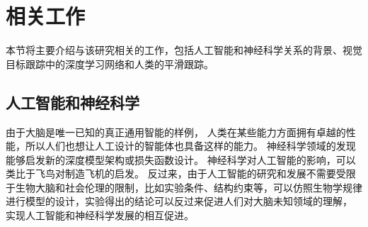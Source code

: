 


\section{相关工作}
本节将主要介绍与该研究相关的工作，包括人工智能和神经科学关系的背景、视觉目标跟踪中的深度学习网络和人类的平滑跟踪。

\subsection{人工智能和神经科学}
由于大脑是唯一已知的真正通用智能的样例，
人类在某些能力方面拥有卓越的性能，所以人们也想让人工设计的智能体也具备这样的能力。
神经科学领域的发现能够启发新的深度模型架构或损失函数设计。
神经科学对人工智能的影响，可以类比于飞鸟对制造飞机的启发。
反过来，由于人工智能的研究和发展不需要受限于生物大脑和社会伦理的限制，比如实验条件、结构约束等，可以仿照生物学规律进行模型的设计，实验得出的结论可以反过来促进人们对大脑未知领域的理解，
实现人工智能和神经科学发展的相互促进。


